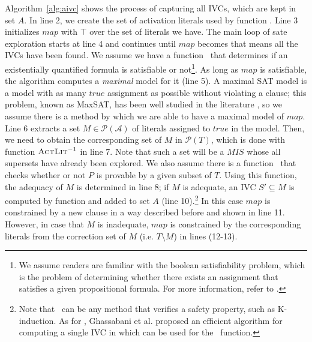 

Algorithm~\ref{alg:aivc} shows the process of capturing all IVCs, which are kept in set $A$.
In line 2, we create the set of activation literals used by function \actlit . Line 3 initializes $map$ with $\top$ over the set of literals we have. The main loop of sate exploration starts at line 4 and continues until $map$ becomes \unsat that means all the IVCs have been found. We assume we have a function \checksat ~that determines if an existentially quantified formula  is satisfiable or not\footnote{We assume readers are familiar with the boolean satisfiability problem, which is the problem of determining whether there exists an assignment that satisfies a given propositional formula. For more information, refer to \cite{cook1971complexity}.}.
As long as $map$ is satisfiable, the algorithm computes a \emph{maximal} \sat model for it (line 5). A maximal SAT model is a model with as many $true$ assignment as possible without violating a clause; this problem, known as MaxSAT, has been well studied in the literature \cite{cimatti2013modular, davies2011solving, morgado2013iterative}, so we assume there is a method by which we are able to have a maximal model of $map$.
Line 6 extracts a set $M \in \mathcal{P} (\mathcal{A})$ of literals assigned to $true$ in the model.
Then, we need to obtain the corresponding set of $M$ in $\mathcal{P}(T)$, which is done with function $\textsc{ActLit} ^{-1}$ in line 7. Note that such a set will be a $MIS$ whose all supersets have already been explored. We also assume there is a function \isadeq ~that checks whether or not $P$ is provable by a given subset of $T$. Using this function, the adequacy of $M$ is determined in line 8; if $M$ is adequate, an IVC $S' \subseteq M$ is computed by function \getivc and added to set $A$ (line 10).\footnote{Note that \isadeq ~can be any method that verifies a safety property, such as K-induction. As for \getivc , Ghassabani et al. proposed an efficient algorithm for computing a single IVC in \cite{Ghass16} which can be used for the \getivc ~function.} In this case $map$ is constrained by a new clause in a way described before and shown in line 11. However, in case that $M$ is inadequate, $map$ is constrained by the corresponding literals from the correction set of $M$ (i.e. $T \setminus M$) in lines (12-13).

